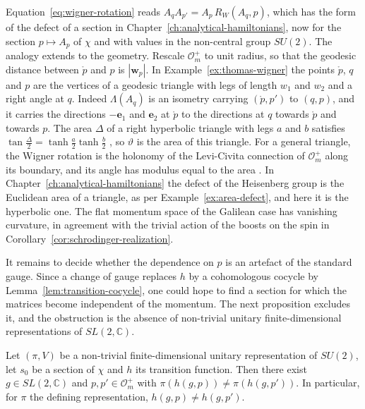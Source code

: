 \begin{remark}
	Equation~\eqref{eq:wigner-rotation} reads $A_qA_{p'}=A_p\,R_W(A_q,p)$, which has the form of the defect of a section in Chapter~\ref{ch:analytical-hamiltonians}, now for the section $p\mapsto A_p$ of $\chi$ and with values in the non-central group $SU(2)$. The analogy extends to the geometry. Rescale $\mathcal{O}_m^+$ to unit radius, so that the geodesic distance between $\mathring{p}$ and $p$ is $|\mathbf{w}_p|$. In Example~\ref{ex:thomas-wigner} the points $\mathring{p}$, $q$ and $p$ are the vertices of a geodesic triangle with legs of length $w_1$ and $w_2$ and a right angle at $q$. Indeed $\Lambda(A_q)$ is an isometry carrying $(\mathring{p},p')$ to $(q,p)$, and it carries the directions $-\mathbf{e}_1$ and $\mathbf{e}_2$ at $\mathring{p}$ to the directions at $q$ towards $\mathring{p}$ and towards $p$. The area $\Delta$ of a right hyperbolic triangle with legs $a$ and $b$ satisfies $\tan\tfrac\Delta2=\tanh\tfrac a2\tanh\tfrac b2$ \cite[TODO-location]{TODO-Ratcliffe}, so $\vartheta$ is the area of this triangle. For a general triangle, the Wigner rotation is the holonomy of the Levi-Civita connection of $\mathcal{O}_m^+$ along its boundary, and its angle has modulus equal to the area \cite[TODO-location]{TODO-Aravind1997}. In Chapter~\ref{ch:analytical-hamiltonians} the defect of the Heisenberg group is the Euclidean area of a triangle, as per Example~\ref{ex:area-defect}, and here it is the hyperbolic one. The flat momentum space of the Galilean case has vanishing curvature, in agreement with the trivial action of the boosts on the spin in Corollary~\ref{cor:schrodinger-realization}.
\end{remark}

It remains to decide whether the dependence on $p$ is an artefact of the standard gauge. Since a change of gauge replaces $h$ by a cohomologous cocycle by Lemma~\ref{lem:transition-cocycle}, one could hope to find a section for which the matrices become independent of the momentum. The next proposition excludes it, and the obstruction is the absence of non-trivial unitary finite-dimensional representations of $SL(2,\mathbb{C})$.

\begin{proposition}\label{prop:wigner-no-gauge}
	Let $(\pi,V)$ be a non-trivial finite-dimensional unitary representation of $SU(2)$, let $s_0$ be a section of $\chi$ and $h$ its transition function. Then there exist $g\in SL(2,\mathbb{C})$ and $p,p'\in\mathcal{O}_m^+$ with $\pi(h(g,p))\neq\pi(h(g,p'))$. In particular, for $\pi$ the defining representation, $h(g,p)\neq h(g,p')$.
\end{proposition}

